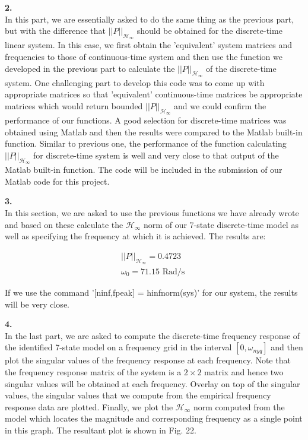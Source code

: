 \documentclass[paper=US leter, fontsize=11pt]{scrartcl}
\begin{document}
\vspace{20pt}
\textbf{2.}\\
In this part, we are essentially asked to do the same thing as the previous part, but with the difference that $||P||_{\mathcal{H}_{\infty}}$ should be obtained for the discrete-time linear system. In this case, we first obtain the 'equivalent' system matrices and frequencies to those of continuous-time system and then use the function we developed in the previous part to calculate the $||P||_{\mathcal{H}_{\infty}}$ of the discrete-time system. One challenging part to develop this code was to come up with appropriate matrices so that 'equivalent' continuous-time matrices be appropriate matrices which would return bounded $||P||_{\mathcal{H}_{\infty}}$ and we could confirm the performance of our functions. A good selection for discrete-time matrices was obtained using Matlab and then the results were compared to the Matlab built-in function. Similar to previous one, the performance of the function calculating $||P||_{\mathcal{H}_{\infty}}$ for discrete-time system is well and very close to that output of the Matlab built-in function. The code will be included in the submission of our Matlab code for this project.

\vspace{20pt}
\textbf{3.}\\
In this section, we are asked to use the previous functions we have already wrote and based on these calculate the $\mathcal{H}_{\infty}$ norm of our 7-state discrete-time model as well as specifying
the frequency at which it is achieved. The results are:

\begin{gather*}
	||P||_{\mathcal{H}_{\infty}} = 0.4723 \\
	 \omega_{0} = 71.15 \text{ Rad/s } 
\end{gather*}

If we use the command '[ninf,fpeak] = hinfnorm(sys)' for our system, the results will be very close.

\vspace{20pt}
\textbf{4.}\\
In the last part, we are asked to compute the discrete-time frequency response of the identified 7-state model on a frequency grid in the interval
$[0,\omega_{nyq}]$ and then plot the singular values of the frequency response at each frequency. Note that the frequency response matrix of the system is a $2\times2$ matrix and hence two singular values will be obtained at each frequency. Overlay on top of the singular values, the singular values that we compute from the empirical frequency response data are plotted. Finally, we plot the $\mathcal{H}_{\infty}$ norm computed from the model which locates the magnitude and corresponding frequency as a single point in this graph. The resultant plot is shown in Fig. 22.
\end{document}
